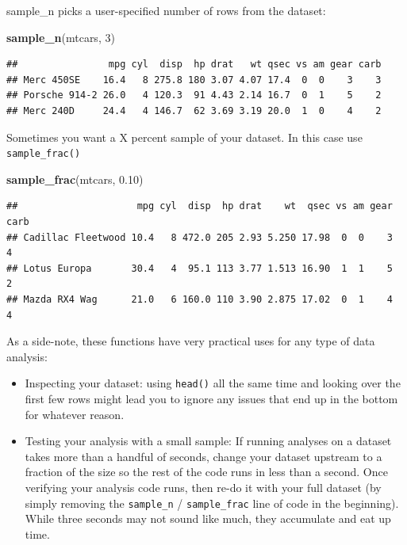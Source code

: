 \documentclass[
]{book}
\newenvironment{Shaded}{\begin{snugshade}}{\end{snugshade}}
\newcommand{\DecValTok}[1]{\textcolor[rgb]{0.00,0.00,0.81}{#1}}
\newcommand{\FloatTok}[1]{\textcolor[rgb]{0.00,0.00,0.81}{#1}}
\newcommand{\KeywordTok}[1]{\textcolor[rgb]{0.13,0.29,0.53}{\textbf{#1}}}
\newcommand{\NormalTok}[1]{#1}
\providecommand{\tightlist}{%
  \setlength{\itemsep}{0pt}\setlength{\parskip}{0pt}}
\theoremstyle{definition}
\theoremstyle{definition}
\theoremstyle{definition}
\theoremstyle{remark}
\begin{document}
sample\_n picks a user-specified number of rows from the dataset:

\begin{Shaded}
\begin{Highlighting}[]
\KeywordTok{sample\_n}\NormalTok{(mtcars, }\DecValTok{3}\NormalTok{)}
\end{Highlighting}
\end{Shaded}

\begin{verbatim}
##                mpg cyl  disp  hp drat   wt qsec vs am gear carb
## Merc 450SE    16.4   8 275.8 180 3.07 4.07 17.4  0  0    3    3
## Porsche 914-2 26.0   4 120.3  91 4.43 2.14 16.7  0  1    5    2
## Merc 240D     24.4   4 146.7  62 3.69 3.19 20.0  1  0    4    2
\end{verbatim}

Sometimes you want a X percent sample of your dataset. In this case use \texttt{sample\_frac()}

\begin{Shaded}
\begin{Highlighting}[]
\KeywordTok{sample\_frac}\NormalTok{(mtcars, }\FloatTok{0.10}\NormalTok{)}
\end{Highlighting}
\end{Shaded}

\begin{verbatim}
##                     mpg cyl  disp  hp drat    wt  qsec vs am gear carb
## Cadillac Fleetwood 10.4   8 472.0 205 2.93 5.250 17.98  0  0    3    4
## Lotus Europa       30.4   4  95.1 113 3.77 1.513 16.90  1  1    5    2
## Mazda RX4 Wag      21.0   6 160.0 110 3.90 2.875 17.02  0  1    4    4
\end{verbatim}

As a side-note, these functions have very practical uses for any type of data analysis:

\begin{itemize}
\tightlist
\item
  Inspecting your dataset: using \texttt{head()} all the same time and looking over the first few rows might lead you to ignore any issues that end up in the bottom for whatever reason.
\item
  Testing your analysis with a small sample: If running analyses on a dataset takes more than a handful of seconds, change your dataset upstream to a fraction of the size so the rest of the code runs in less than a second. Once verifying your analysis code runs, then re-do it with your full dataset (by simply removing the \texttt{sample\_n} / \texttt{sample\_frac} line of code in the beginning). While three seconds may not sound like much, they accumulate and eat up time.
\end{itemize}
\end{document}
